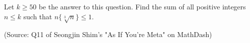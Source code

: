Let $k\ge 50$ be the answer to this question. Find the sum of all positive integers $n \le k$ such that $n\{\sqrt[3]{n}\} \le 1$.



(Source: Q11 of Seongjin Shim's "As If You're Meta" on MathDash)
